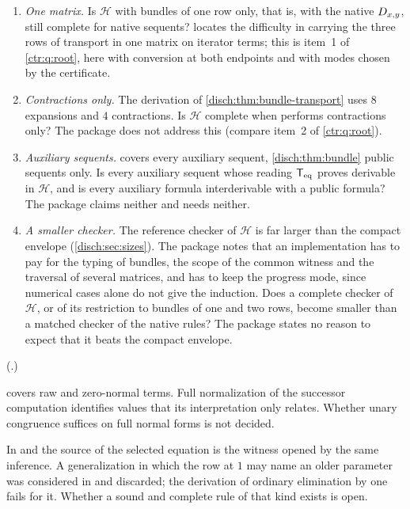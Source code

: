 \begin{question}
\label{disch:q:bundle}
\begin{enumerate}
\item \emph{One matrix.} Is $\mathcal H$ with bundles of one row only, that
 is, with the native $D_{x,y}$, still complete for native sequents?
  locates the difficulty in carrying the
 three rows of transport in one matrix on iterator terms; this is item~1 of
 \cref{ctr:q:root}, here with conversion at both endpoints and with modes
 chosen by the certificate.
\item \emph{Contractions only.} The derivation of
 \cref{disch:thm:bundle-transport} uses $8$ expansions and $4$
 contractions. Is $\mathcal H$ complete when  performs
 contractions only? The package does not address this (compare item~2 of
 \cref{ctr:q:root}).
\item \emph{Auxiliary sequents.}  covers every
 auxiliary sequent, \cref{disch:thm:bundle} public sequents only. Is every
 auxiliary sequent whose reading $\mathsf{T}_{\mathrm{eq}}$ proves derivable in $\mathcal H$,
 and is every auxiliary formula interderivable with a public formula? The
 package claims neither and needs neither.
\item \emph{A smaller checker.} The reference checker of $\mathcal H$ is far
 larger than the compact envelope (\cref{disch:sec:sizes}). The package
 notes that an implementation has to pay for the typing of bundles, the
 scope of the common witness and the traversal of several matrices, and
 has to keep the progress mode, since numerical cases alone do not give the
 induction. Does a complete checker of $\mathcal H$, or of its restriction
 to bundles of one and two rows, become smaller than a matched checker of
 the native rules? The package states no reason to expect that it beats
 the compact envelope.
\end{enumerate}
(.)
\end{question}

\begin{question}
 covers raw and zero-normal terms. Full
normalization of the successor computation identifies values that its
interpretation only relates. Whether unary congruence suffices on full
normal forms is not decided.
\end{question}

\begin{question}
In  and  the source of the selected
equation is the witness opened by the same inference. A generalization in
which the row at $1$ may name an older parameter was considered in
 and discarded; the derivation of ordinary
elimination by one  fails for it. Whether a sound and
complete rule of that kind exists is open.
\end{question}

